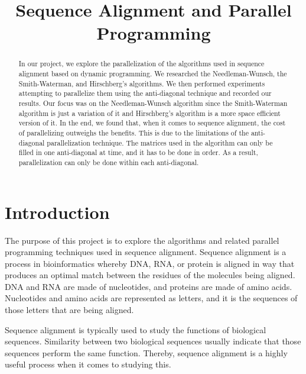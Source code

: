 \documentclass[conference]{IEEEtran}
\begin{document}
\title{Sequence Alignment and Parallel Programming}

\author{
\and
{}
\and
{}
}

\maketitle

\begin{abstract}
In our project, we explore the parallelization of the algorithms used in sequence alignment based on dynamic programming. We researched the Needleman-Wunsch, the Smith-Waterman, and Hirschberg's algorithms. We then performed experiments attempting to parallelize them using the anti-diagonal technique and recorded our results. Our focus was on the Needleman-Wunsch algorithm since the Smith-Waterman algorithm is just a variation of it and Hirschberg's algorithm is a more space efficient version of it. In the end, we found that, when it comes to sequence alignment, the cost of parallelizing outweighs the benefits. This is due to the limitations of the anti-diagonal parallelization technique. The matrices used in the algorithm can only be filled in one anti-diagonal at time, and it has to be done in order. As a result, parallelization can only be done within each anti-diagonal.
\end{abstract}

\section{Introduction}
The purpose of this project is to explore the algorithms and related parallel programming techniques used in sequence alignment. Sequence alignment is a process in bioinformatics whereby DNA, RNA, or protein is aligned in way that produces an optimal match between the residues of the molecules being aligned. DNA and RNA are made of nucleotides, and proteins are made of amino acids. Nucleotides and amino acids are represented as letters, and it is the sequences of those letters that are being aligned.

Sequence alignment is typically used to study the functions of biological sequences. Similarity between two biological sequences usually indicate that those sequences perform the same function. Thereby, sequence alignment is a highly useful process when it comes to studying this.
\end{document}
